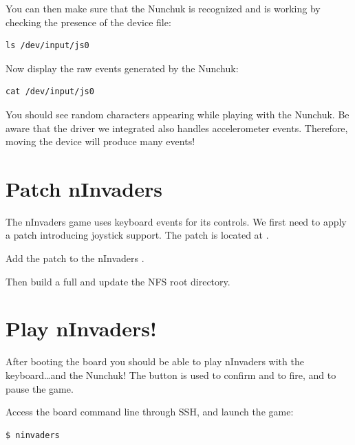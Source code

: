 You can then make sure that the Nunchuk is recognized and is working by
checking the presence of the  device file:
\begin{verbatim}
ls /dev/input/js0
\end{verbatim}

Now display the raw events generated by the Nunchuk:
\begin{verbatim}
cat /dev/input/js0
\end{verbatim}

You should see random characters appearing while playing with the Nunchuk. Be
aware that the driver we integrated also handles accelerometer events. Therefore,
moving the device will produce many events!

\section{Patch nInvaders}

The nInvaders game uses keyboard events for its controls. We first need to apply
a patch introducing joystick support. The patch is located at
.

Add the patch to the nInvaders .

Then build a full  and update the NFS root
directory.

\section{Play nInvaders!}

After booting the board you should be able to play nInvaders with the
keyboard\dots and the Nunchuk! The  button is used to confirm and to
fire, and  to pause the game.

Access the board command line through SSH, and launch the game:
\begin{verbatim}
$ ninvaders
\end{verbatim}
